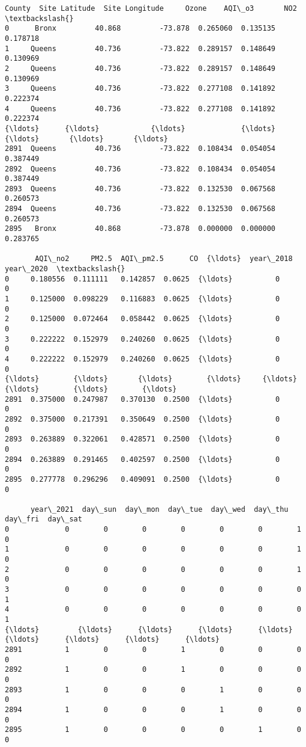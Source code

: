 \documentclass[11pt]{article}
\makeatletter
\newcommand{\boxspacing}{\kern\kvtcb@left@rule\kern\kvtcb@boxsep}
\newcommand{\prompt}[4]{
        {\ttfamily\llap{{\color{#2}[#3]:\hspace{3pt}#4}}\vspace{-\baselineskip}}
    }
\makeatother
\begin{document}
            \begin{tcolorbox}[breakable, size=fbox, boxrule=.5pt, pad at break*=1mm, opacityfill=0]
\prompt{Out}{outcolor}{34}{\boxspacing}
\begin{Verbatim}[commandchars=\\\{\}]
      County  Site Latitude  Site Longitude     Ozone    AQI\_o3       NO2  \textbackslash{}
0      Bronx         40.868         -73.878  0.265060  0.135135  0.178718
1     Queens         40.736         -73.822  0.289157  0.148649  0.130969
2     Queens         40.736         -73.822  0.289157  0.148649  0.130969
3     Queens         40.736         -73.822  0.277108  0.141892  0.222374
4     Queens         40.736         -73.822  0.277108  0.141892  0.222374
{\ldots}      {\ldots}            {\ldots}             {\ldots}       {\ldots}       {\ldots}       {\ldots}
2891  Queens         40.736         -73.822  0.108434  0.054054  0.387449
2892  Queens         40.736         -73.822  0.108434  0.054054  0.387449
2893  Queens         40.736         -73.822  0.132530  0.067568  0.260573
2894  Queens         40.736         -73.822  0.132530  0.067568  0.260573
2895   Bronx         40.868         -73.878  0.000000  0.000000  0.283765

       AQI\_no2     PM2.5  AQI\_pm2.5      CO  {\ldots}  year\_2018  year\_2020  \textbackslash{}
0     0.180556  0.111111   0.142857  0.0625  {\ldots}          0          0
1     0.125000  0.098229   0.116883  0.0625  {\ldots}          0          0
2     0.125000  0.072464   0.058442  0.0625  {\ldots}          0          0
3     0.222222  0.152979   0.240260  0.0625  {\ldots}          0          0
4     0.222222  0.152979   0.240260  0.0625  {\ldots}          0          0
{\ldots}        {\ldots}       {\ldots}        {\ldots}     {\ldots}  {\ldots}        {\ldots}        {\ldots}
2891  0.375000  0.247987   0.370130  0.2500  {\ldots}          0          0
2892  0.375000  0.217391   0.350649  0.2500  {\ldots}          0          0
2893  0.263889  0.322061   0.428571  0.2500  {\ldots}          0          0
2894  0.263889  0.291465   0.402597  0.2500  {\ldots}          0          0
2895  0.277778  0.296296   0.409091  0.2500  {\ldots}          0          0

      year\_2021  day\_sun  day\_mon  day\_tue  day\_wed  day\_thu  day\_fri  day\_sat
0             0        0        0        0        0        0        1        0
1             0        0        0        0        0        0        1        0
2             0        0        0        0        0        0        1        0
3             0        0        0        0        0        0        0        1
4             0        0        0        0        0        0        0        1
{\ldots}         {\ldots}      {\ldots}      {\ldots}      {\ldots}      {\ldots}      {\ldots}      {\ldots}      {\ldots}
2891          1        0        0        1        0        0        0        0
2892          1        0        0        1        0        0        0        0
2893          1        0        0        0        1        0        0        0
2894          1        0        0        0        1        0        0        0
2895          1        0        0        0        0        1        0        0


\end{Verbatim}
\end{tcolorbox}
\end{document}
